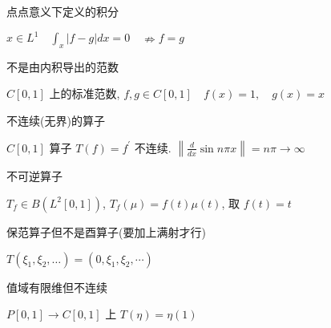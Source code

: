 \documentclass[10pt, twocolumn]{yerbaformat}
\begin{document}
\begin{example}
    点点意义下定义的积分
\end{example}

$x \in L^{1} \quad \int_{x}|f-g| d x=0 \quad \nRightarrow f=g$

\begin{example}
    不是由内积导出的范数
\end{example}

$C[0, 1]$ 上的标准范数, $f, g \in C[0,1] \quad f(x)=1, \quad g(x)=x$

\begin{example}
    不连续(无界)的算子 
\end{example}

$C[0, 1]$ 算子 $T(f)=f^{\prime}$ 不连续. $\left\|\frac{d}{d x} \sin n \pi x\right\|=n \pi \rightarrow \infty$

\begin{example}
    不可逆算子
\end{example}

$T_{f} \in B\left(L^{2}[0,1]\right)$, $T_{f}(\mu)=f(t) \mu(t)$, 取 $f(t)=t$

\begin{example}
    保范算子但不是酉算子(要加上满射才行)
\end{example}

$T\left(\xi_{1}, \xi_{2}, \ldots\right)=\left(0, \xi_{1},\xi_{2}, \cdots\right)$

\begin{example}
    值域有限维但不连续
\end{example}

$P[0, 1] \rightarrow C[0, 1]$ 上 $T(\eta)=\eta(1)$
\end{document}
